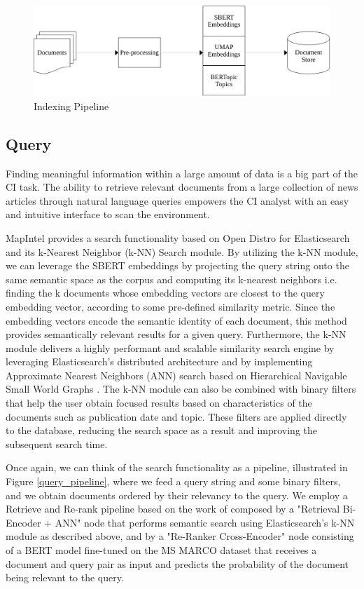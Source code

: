 \documentclass[a4paper]{article}
\begin{document}
\begin{figure}[H]
	\centering
	\includegraphics[scale=0.7]{./assets/indexing_pipeline}
	\caption{Indexing Pipeline}
	\label{indexing_pipeline}
\end{figure}

\subsection{Query}
Finding meaningful information within a large amount of data is a big part of the CI task. The ability to retrieve relevant documents from a large collection of news articles through natural language queries empowers the CI analyst with an easy and intuitive interface to scan the environment.

MapIntel provides a search functionality based on Open Distro for Elasticsearch and its k-Nearest Neighbor (k-NN) Search module. By utilizing the k-NN module, we can leverage the SBERT embeddings by projecting the query string onto the same semantic space as the corpus and computing its k-nearest neighbors i.e. finding the k documents whose embedding vectors are closest to the query embedding vector, according to some pre-defined similarity metric. Since the embedding vectors encode the semantic identity of each document, this method provides semantically relevant results for a given query. Furthermore, the k-NN module delivers a highly performant and scalable similarity search engine by leveraging Elasticsearch’s distributed architecture and by implementing Approximate Nearest Neighbors (ANN) search based on Hierarchical Navigable Small World Graphs \citep{malkov2018}. The k-NN module can also be combined with binary filters that help the user obtain focused results based on characteristics of the documents such as publication date and topic. These filters are applied directly to the database, reducing the search space as a result and improving the subsequent search time.

Once again, we can think of the search functionality as a pipeline, illustrated in Figure \ref{query_pipeline}, where we feed a query string and some binary filters, and we obtain documents ordered by their relevancy to the query. We employ a Retrieve and Re-rank pipeline based on the work of \citet{nogueira2020a, kratzwald2019} composed by a "Retrieval Bi-Encoder + ANN" node that performs semantic search using Elasticsearch’s k-NN module as described above, and by a "Re-Ranker Cross-Encoder" node consisting of a BERT model fine-tuned on the MS MARCO dataset that receives a document and query pair as input and predicts the probability of the document being relevant to the query. 
\end{document}

